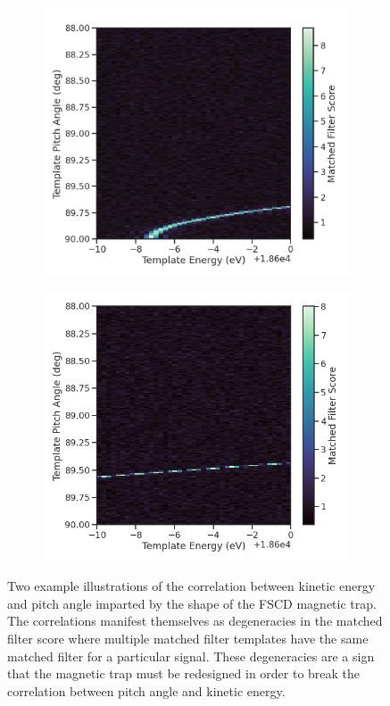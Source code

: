 \begin{figure}[htbp]
    \centering
    \begin{subfigure}{0.49\textwidth}
        \includegraphics[width=\textwidth]{figs/Chapter-4/230517_mf_degen_1.png}
        \caption{}
    \end{subfigure}
    \hfill
    \begin{subfigure}{0.49\textwidth}
        \includegraphics[width=\textwidth]{figs/Chapter-4/230517_mf_degen_2.png}
        \caption{}
    \end{subfigure}
    \caption{Two example illustrations of the correlation between kinetic energy and pitch angle imparted by the shape of the FSCD magnetic trap. The correlations manifest themselves as degeneracies in the matched filter score where multiple matched filter templates have the same matched filter for a particular signal. These degeneracies are a sign that the magnetic trap must be redesigned in order to break the correlation between pitch angle and kinetic energy. }
    \label{fig:chap4-mf-degeneracy}
\end{figure}

